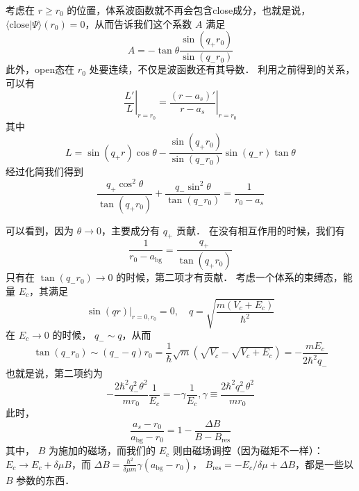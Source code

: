 考虑在 $r\ge r_0$ 的位置，体系波函数就不再会包含close成分，也就是说， $\langle\text{close}|\Psi\rangle(r_0) = 0$，从而告诉我们这个系数 $A$ 满足
\begin{equation}
A=-\tan\theta\frac{\sin(q_+r_0)}{\sin(q_-r_0)}
\end{equation}
此外，open态在 $r_0$ 处要连续，不仅是波函数还有其导数． 利用之前得到的关系，可以有
\begin{equation}
\left.\frac{L'}{L}\right|_{r=r_0} = \left.\frac{(r-a_s)'}{r-a_s}\right|_{r=r_0}
\end{equation}
其中
\begin{equation}
L = \sin(q_+r)\cos\theta - \frac{\sin(q_+r_0)}{\sin(q_-r_0)} \sin(q_-r)\tan\theta
\end{equation}
经过化简我们得到
\begin{equation}
\frac{q_+\cos^2\theta}{\tan(q_+r_0)}+\frac{q_-\sin^2\theta}{\tan(q_-r_0)} = \frac{1}{r_0-a_s}
\end{equation}

可以看到，因为 $\theta\to0$，主要成分有 $q_+$ 贡献． 在没有相互作用的时候，我们有
\begin{equation}
\frac{1}{r_0-a_{\text{bg}}} = \frac{q_+}{\tan(q_+r_0)}
\end{equation}
只有在 $\tan(q_-r_0)\to0$ 的时候，第二项才有贡献．
考虑一个体系的束缚态，能量 $E_c$，其满足
\begin{equation}
\left.\sin(qr)\right|_{r=0,r_0} = 0,\quad q = \sqrt{\frac{m(V_c+E_c)}{\hbar^2}}
\end{equation}
在 $E_c\to0$ 的时候， $q_-\sim q$，从而
\begin{equation}
\tan(q_-r_0)\sim (q_- -q) r_0 = \frac{1}{\hbar}\sqrt{m}(\sqrt{V_c}-\sqrt{V_c+E_c}) =-\frac{mE_c}{2\hbar^2 q_-}
\end{equation}
也就是说，第二项约为
\begin{equation}
-\frac{2\hbar^2q_-^2\theta^2}{mr_0}\frac{1}{E_c} = -\gamma\frac{1}{E_c}, \gamma\equiv\frac{2\hbar^2q_-^2\theta^2}{mr_0} 
\end{equation}
此时，
\begin{equation}
\frac{a_s-r_0}{a_{\text{bg}}-r_0} = 1-\frac{\Delta B}{B-B_{\text{res}}}
\end{equation}
其中， $B$ 为施加的磁场，而我们的 $E_c$ 则由磁场调控（因为磁矩不一样）： $E_c\to E_c+\delta\mu B$，而 $\Delta B = \frac{\hbar^2}{\delta\mu m}\gamma(a_{\text{bg}}-r_0)$， $B_{\text{res}} = -{E_c}/{\delta\mu}+\Delta B$，都是一些以 $B$ 参数的东西．